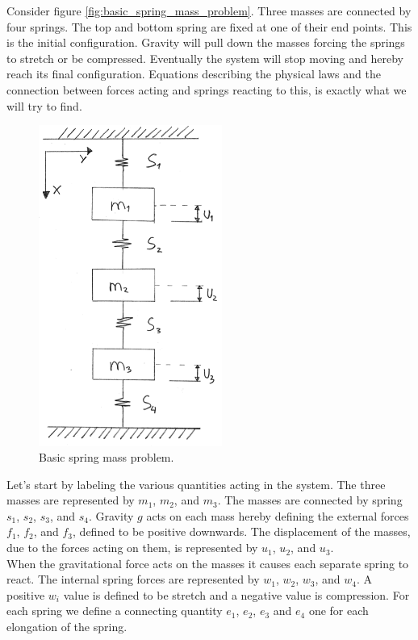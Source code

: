 Consider figure \vref{fig:basic_spring_mass_problem}.
Three masses are connected by four
springs. The top and bottom spring are fixed at one of their end
points. This is the
initial configuration. Gravity will pull down the masses forcing the
springs to stretch or be compressed. Eventually the system will stop
moving and hereby reach its final configuration. Equations
describing the physical laws and the connection between forces acting
and springs reacting to this, is exactly what we will try to find. \\

\layoutnewpage

\begin{figure}
  \centering
  \includegraphics[width=6cm]{./images/equilibrium_framework_basic_spring_mass_problem.png}
\caption{Basic spring mass problem.}
\label{fig:basic_spring_mass_problem}
\end{figure}

Let's start by labeling the various quantities acting in the
system. The three masses are represented by $m_1$, $m_2$, and $m_3$. 
The masses are connected by spring $s_1$, $s_2$, $s_3$, and $s_4$.
Gravity $g$ acts on each mass hereby defining the external
forces $f_1$, $f_2$, and $f_3$, defined to be positive downwards. 
The displacement of the masses, due to the forces acting on them, is represented
by $u_1$, $u_2$, and $u_3$. \\ 

When the gravitational force acts on the masses it causes each separate spring to
react. The internal spring forces are represented by $w_1$, $w_2$,
$w_3$, and $w_4$. A positive $w_i$ value is defined to be stretch and
a negative value is compression. For each spring we define a connecting quantity
$e_1$, $e_2$, $e_3$ and $e_4$ one for each elongation of the spring. \\


